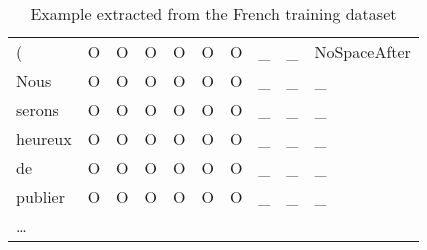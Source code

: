 \begin{table}[!htbp]
{\begin{tabular}{l|ll|lll|l|ll|l}
            (                                   & O                              & O                            & O             & O                        & O    & O             & \_      & \_   & NoSpaceAfter \\
            Nous                                & O                              & O                            & O             & O                        & O    & O             & \_      & \_   & \_           \\
            serons                              & O                              & O                            & O             & O                        & O    & O             & \_      & \_   & \_           \\
            heureux                             & O                              & O                            & O             & O                        & O    & O             & \_      & \_   & \_           \\
            de                                  & O                              & O                            & O             & O                        & O    & O             & \_      & \_   & \_           \\
            publier                             & O                              & O                            & O             & O                        & O    & O             & \_      & \_   & \_           \\
            \dots                                                                                                                                                                                                 \\
        \end{tabular}
    }
    \caption{Example extracted from the French training dataset}
    \label{extraitCorpus}
\end{table}


